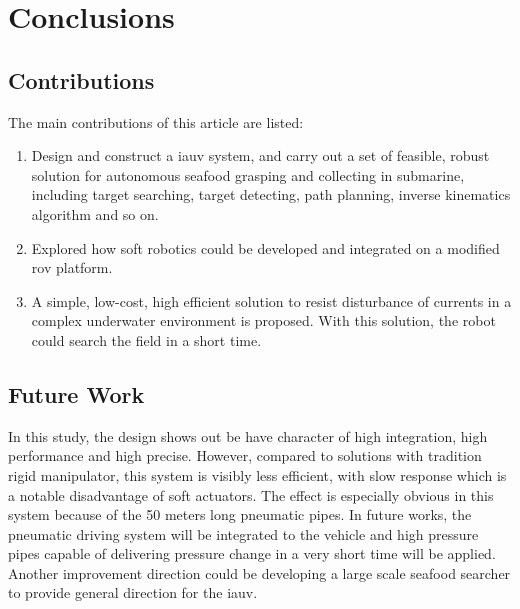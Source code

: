 \section{Conclusions}

\subsection{Contributions}

The main contributions of this article are listed:

\begin{enumerate}
    \item Design and construct a \gls{iauv} system, and carry out a set of
    feasible, robust solution for autonomous seafood grasping and collecting in
    submarine, including target searching, target detecting, path planning,
    inverse kinematics algorithm and so on.
    \item Explored how soft robotics could be developed and integrated on a
    modified \gls{rov} platform.
    \item A simple, low-cost, high efficient solution to resist disturbance of
    currents in a complex underwater environment is proposed. With this
    solution, the robot could search the field in a short time.
\end{enumerate}

\subsection{Future Work}

In this study, the design shows out be have character of high integration, high
performance and high precise. However, compared to solutions with tradition
rigid manipulator, this system is visibly less efficient, with slow response
which is a notable disadvantage of soft actuators. The effect is especially
obvious in this system because of the 50 meters long pneumatic pipes. In future
works, the pneumatic driving system will be integrated to the vehicle and high
pressure pipes capable of delivering pressure change in a very short time will
be applied. Another improvement direction could be developing a large scale
seafood searcher to provide general direction for the \gls{iauv}.